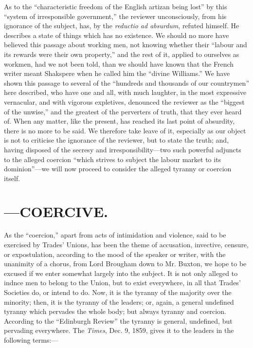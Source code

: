 As to the ``characteristic freedom of the English artizan being lost''
by this ``system of irresponsible government,'' the reviewer
unconsciously, from his ignorance of the subject, has, by the
\textit{reductio ad absurdum}, refuted himself. He describes a state of
things which has no existence. We should no more have believed this
passage about working men, not knowing whether their ``labour and its
rewards were their own property,'' and the rest of it, applied to
ourselves as workmen, had we not been told, than we should have known
that the French writer meant Shakspere when he called him the ``divine
Williams.'' We have shown this passage to several of the ``hundreds and
thousands of our countrymen'' here described, who have one and all, with
much laughter, in the most expressive vernacular, and with vigorous
expletives, denounced the reviewer as the ``biggest of the unwise,'' and
the greatest of the perverters of truth, that they ever heard of. When
any matter, like the present, has reached its last point of absurdity,
there is no more to be said. We therefore take leave of it, especially
as our object is not to criticise the ignorance of the reviewer, but to
state the truth; and, having disposed of the secresy and
irresponsibility---two such powerful adjuncts to the alleged coercion
``which strives to subject the labour market to its dominion''---we
will now proceed to consider the alleged tyranny or coercion itself.

\section{---COERCIVE.}

As the ``coercion,'' apart from acts of intimidation and violence, said
to be exercised by Trades' Unions, has been the theme of accusation,
invective, censure, or expostulation, according to the mood of the
speaker or writer, with the unanimity of a chorus, from Lord Brougham
down to Mr. Buxton, we hope to be excused if we enter somewhat largely
into the subject. It is not only alleged to indnce men to belong to the
Union, but to exist everywhere, in all that Trades' Societies do, or
intend to do. Now, it is the tyranny of the majority over the minority;
then, it is the tyranny of the leaders; or, again, a general undefined
tyranny which pervades the whole body; but always tyranny and coercion.
According to the ``Edinburgh Review'' the tyranny is general, undefined,
but pervading everywhere. The \textit{Times}, Dec. 9, 1859, gives it to
the leaders in the following terms:---


